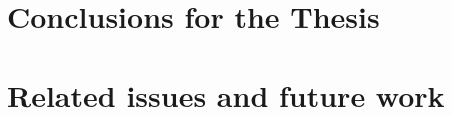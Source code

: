 \section{Conclusions for the Thesis}
\label{conclusions:thesis}


\section{Related issues and future work}
\label{conclusions:future}

